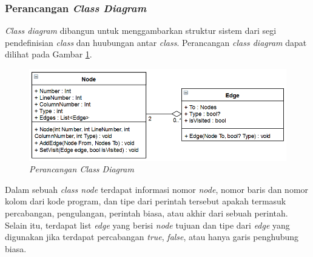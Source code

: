 \subsubsection*{Perancangan \textit{Class Diagram}}
\textit{Class diagram} dibangun untuk menggambarkan struktur sistem dari segi pendefinisian \textit{class} dan huubungan antar \textit{class}. Perancangan \textit{class diagram} dapat dilihat pada Gambar \ref{fig:classdiagram}.
\begin{figure}
	\centering
	\includegraphics[width=0.95\linewidth]{gambar/classdiagram}
	\caption{\textit{Perancangan \textit{Class Diagram}}}
	\label{fig:classdiagram}
\end{figure}

Dalam sebuah \textit{class node} terdapat informasi nomor \textit{node}, nomor baris dan nomor kolom dari kode program, dan tipe dari perintah tersebut apakah termasuk percabangan, pengulangan, perintah biasa, atau akhir dari sebuah perintah. Selain itu, terdapat list \textit{edge} yang berisi \textit{node} tujuan dan tipe dari \textit{edge} yang digunakan jika terdapat percabangan \textit{true}, \textit{false}, atau hanya garis penghubung biasa.

